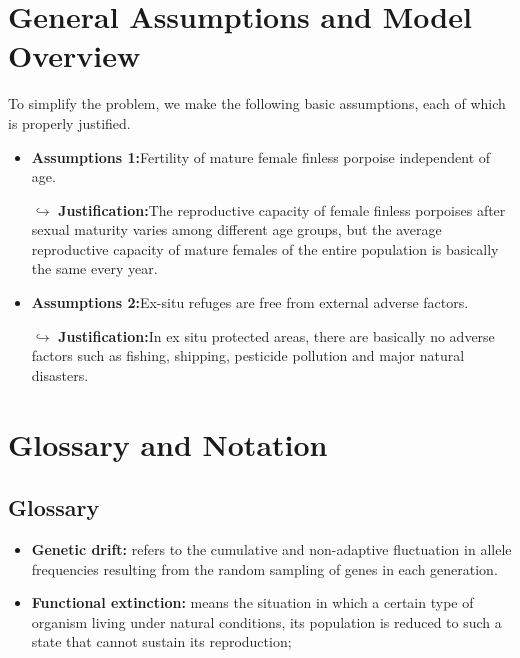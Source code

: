 \documentclass[12pt]{article}  %
\begin{document}
\section{General Assumptions and Model Overview}%

To simplify the problem, we make the following basic assumptions, each of which is properly justified.

\begin{itemize}
	\item \textbf{ Assumptions 1:}Fertility of mature female finless porpoise independent of age.
	
$\hookrightarrow$ \textbf{Justification:}The reproductive capacity of female finless porpoises after sexual maturity varies among different age groups, but the average reproductive capacity of mature females of the entire population is basically the same every year.
	\item \textbf{ Assumptions 2:}Ex-situ refuges are free from external adverse factors.
	
$\hookrightarrow$ \textbf{Justification:}In ex situ protected areas, there are basically no adverse factors such as fishing, shipping, pesticide pollution and major natural disasters.

\end{itemize}

\section{Glossary and Notation}  %
\subsection{Glossary}
\begin{itemize}%
	\item \textbf{Genetic drift: }refers to the cumulative and non-adaptive fluctuation in allele frequencies resulting from the random sampling of genes in each generation. 
	\item  \textbf{Functional extinction: }means the situation in which a certain type of organism living under natural conditions, its population is reduced to such a state that cannot sustain its reproduction;

\end{itemize}
\end{document}
